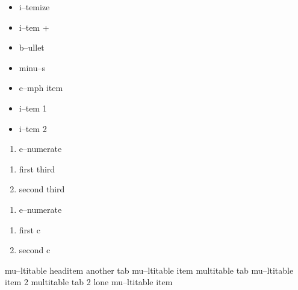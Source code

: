 \documentclass{book}
\begin{document}
\begin{itemize}
\item i--temize
\end{itemize}

\begin{itemize}[label=+]
\item i--tem +
\end{itemize}

\begin{itemize}[label=\textbullet{}]
\item b--ullet
\end{itemize}

\begin{itemize}[label=-]
\item minu--s
\end{itemize}

\begin{itemize}[label=\emph{after emph}]
\item e--mph item
\end{itemize}

\begin{itemize}[label=\textbullet{} a--n itemize line]
\item {}%
i--tem 1
\item i--tem 2
\end{itemize}

\begin{enumerate}[start=1]
\item e--numerate
\end{enumerate}

\begin{enumerate}[start=3]
\item first third
\item second third
\end{enumerate}

\begin{enumerate}[label=\alph*.]
\item e--numerate
\end{enumerate}

\begin{enumerate}[label=\alph*.,start=3]
\item first c
\item second c
\end{enumerate}

mu--ltitable headitem another tab
mu--ltitable item multitable tab
mu--ltitable item 2 multitable tab 2
%
lone mu--ltitable item
\end{document}

